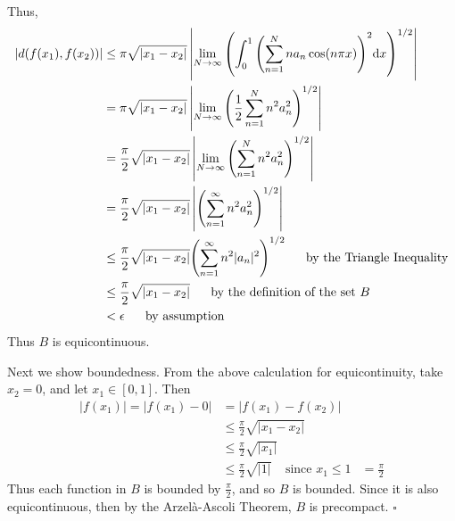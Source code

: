 \documentclass[12pt]{article}
\begin{document}
Thus,
\begin{align*}
	|d(f(x_1), f(x_2))| &\leq \pi\sqrt{|x_1 - x_2|}\left|\lim_{N\rightarrow\infty} \qty(\int_0^1 \qty(\sum_{n=1}^N n a_n \cos(n\pi x))^2 \dd x)^{1/2}\right| \\
	&= \pi\sqrt{|x_1 - x_2|}\left|\lim_{N\rightarrow\infty} \qty(\frac{1}{2}\sum_{n=1}^N n^2 a_n^2)^{1/2}\right| \\
	&= \frac{\pi}{2}\sqrt{|x_1 - x_2|}\left|\lim_{N\rightarrow\infty}\qty(\sum_{n=1}^N n^2 a_n^2)^{1/2}\right| \\
	&= \frac{\pi}{2}\sqrt{|x_1 - x_2|}\left|\qty(\sum_{n=1}^\infty n^2 a_n^2)^{1/2}\right| \\
	&\leq \frac{\pi}{2}\sqrt{|x_1 - x_2|}\qty(\sum_{n=1}^\infty n^2 |a_n|^2)^{1/2}\ \ \ \ \ \text{by the Triangle Inequality} \\
	&\leq \frac{\pi}{2}\sqrt{|x_1 - x_2|}\ \ \ \ \ \text{by the definition of the set $B$} \\
	&< \epsilon\ \ \ \ \ \text{by assumption}
\end{align*}
Thus $B$ is equicontinuous.

Next we show boundedness.  From the above calculation for equicontinuity, take $x_2 = 0$, and let $x_1 \in [0,1]$.  Then
\begin{align*}
	|f(x_1)| = |f(x_1) - 0| &= |f(x_1) - f(x_2)| \\
	&\leq \frac{\pi}{2}\sqrt{|x_1 - x_2|} \\
	&\leq \frac{\pi}{2}\sqrt{|x_1|} \\
	&\leq \frac{\pi}{2}\sqrt{|1|}\ \ \ \ \ \text{since $x_1 \leq 1$}
	&= \frac{\pi}{2}
\end{align*}
Thus each function in $B$ is bounded by $\frac{\pi}{2}$, and so $B$ is bounded.  Since it is also equicontinuous, then by the Arzel\`a-Ascoli Theorem, $B$ is precompact. \hfill $\square$
\end{document}
